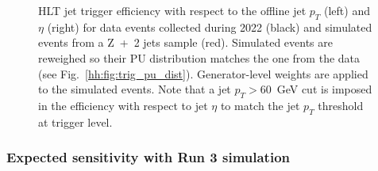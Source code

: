 \documentclass[../main.tex]{subfiles}
\begin{document}
\begin{figure}[h!]
\begin{center}
\end{center}
\caption[HLT jet trigger efficiency]{HLT jet trigger efficiency with respect to the offline jet $p_T$ (left) and $\eta$ (right) for data events collected during 2022 (black) and simulated events from a Z~+~2 jets sample (red). Simulated events are reweighed so their PU distribution matches the one from the data (see Fig.~\ref{hh:fig:trig_pu_dist}). Generator-level weights are applied to the simulated events.  Note that a jet $p_T>60$~GeV cut is imposed in the efficiency with respect to jet $\eta$ to match the jet $p_T$ threshold at trigger level.}
\label{hh:fig:hlt_eff_jet}
\end{figure}


%
%

\subsubsection{Expected sensitivity with Run 3 simulation}
\end{document}
